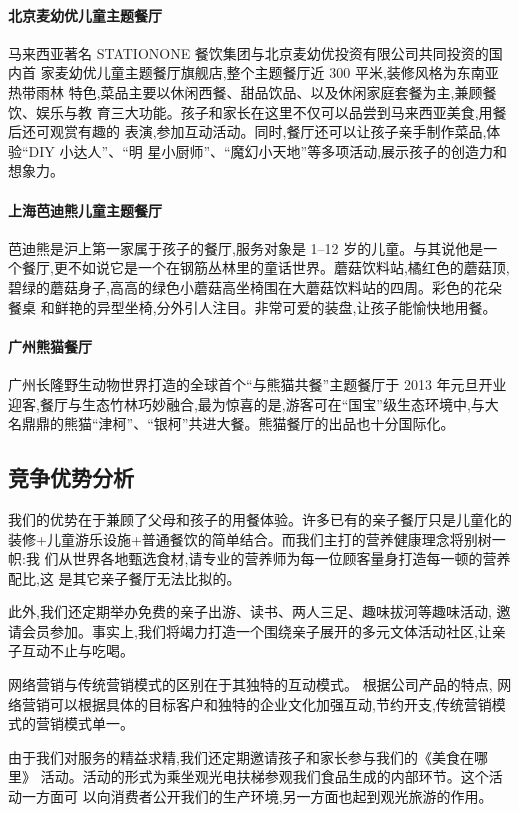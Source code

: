 \paragraph{北京麦幼优儿童主题餐厅}
马来西亚著名 STATIONONE 餐饮集团与北京麦幼优投资有限公司共同投资的国内首
家麦幼优儿童主题餐厅旗舰店,整个主题餐厅近 300 平米,装修风格为东南亚热带雨林
特色,菜品主要以休闲西餐、甜品饮品、以及休闲家庭套餐为主,兼顾餐饮、娱乐与教
育三大功能。孩子和家长在这里不仅可以品尝到马来西亚美食,用餐后还可观赏有趣的
表演,参加互动活动。同时,餐厅还可以让孩子亲手制作菜品,体验“DIY 小达人”、“明
星小厨师”、“魔幻小天地”等多项活动,展示孩子的创造力和想象力。

\paragraph{上海芭迪熊儿童主题餐厅}
芭迪熊是沪上第一家属于孩子的餐厅,服务对象是 1--12 岁的儿童。与其说他是一
个餐厅,更不如说它是一个在钢筋丛林里的童话世界。蘑菇饮料站,橘红色的蘑菇顶,
碧绿的蘑菇身子,高高的绿色小蘑菇高坐椅围在大蘑菇饮料站的四周。彩色的花朵餐桌
和鲜艳的异型坐椅,分外引人注目。非常可爱的装盘,让孩子能愉快地用餐。

\paragraph{广州熊猫餐厅}
广州长隆野生动物世界打造的全球首个“与熊猫共餐”主题餐厅于 2013 年元旦开业
迎客,餐厅与生态竹林巧妙融合,最为惊喜的是,游客可在“国宝”级生态环境中,与大
名鼎鼎的熊猫“津柯”、“银柯”共进大餐。熊猫餐厅的出品也十分国际化。

\subsection{竞争优势分析}
我们的优势在于兼顾了父母和孩子的用餐体验。许多已有的亲子餐厅只是儿童化的
装修+儿童游乐设施+普通餐饮的简单结合。而我们主打的营养健康理念将别树一帜:我
们从世界各地甄选食材,请专业的营养师为每一位顾客量身打造每一顿的营养配比,这
是其它亲子餐厅无法比拟的。

此外,我们还定期举办免费的亲子出游、读书、两人三足、趣味拔河等趣味活动,
邀请会员参加。事实上,我们将竭力打造一个围绕亲子展开的多元文体活动社区,让亲
子互动不止与吃喝。

网络营销与传统营销模式的区别在于其独特的互动模式。 根据公司产品的特点,
网络营销可以根据具体的目标客户和独特的企业文化加强互动,节约开支,传统营销模
式的营销模式单一。

由于我们对服务的精益求精,我们还定期邀请孩子和家长参与我们的《美食在哪里》
活动。活动的形式为乘坐观光电扶梯参观我们食品生成的内部环节。这个活动一方面可
以向消费者公开我们的生产环境,另一方面也起到观光旅游的作用。

